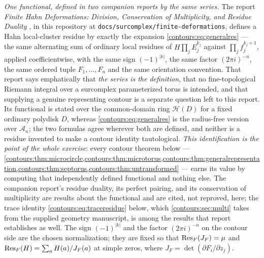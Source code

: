 \documentclass[11pt,letterpaper]{article}
\theoremstyle{definition}
\theoremstyle{remark}
\newcommand{\HH}{\mathcal H}\newcommand{\A}{\mathscr A}\newcommand{\OO}{\mathcal O}
\numberwithin{equation}{section}
\begin{document}
\emph{One functional, defined in two companion reports by the same series.} The
report \emph{Finite Hahn Deformations: Division, Conservation of Multiplicity,
and Residue Duality} \cite{FiniteDeformations}, in this repository at
\texttt{docs/surcomplex/finite-deformations}, defines a Hahn local-cluster
residue by exactly the expansion \eqref{contours:eq:generalres} --- the same
alternating sum of ordinary local residues of $H\prod_jE_j^{k_j}$ against
$\prod_jf_j^{k_j+1}$, applied coefficientwise, with the same sign $(-1)^{|k|}$,
the same factor $(2\pi i)^{-n}$, the same ordered tuple $F_1,\ldots,F_n$ and the
same orientation convention. That report says emphatically that \emph{the series
is the definition}, that no fine-topological Riemann integral over a surcomplex
parameterized torus is intended, and that supplying a genuine representing
contour is a separate question left to this report. Its functional is stated over
the common-domain ring $\HH(D)$ for a fixed ordinary polydisk $D$, whereas
\eqref{contours:eq:generalres} is the radius-free version over $\A_n$; the two
formulas agree wherever both are defined, and neither is a residue invented to
make a contour identity tautological. \emph{This identification is the point of
the whole exercise}: every contour theorem below ---
\cref{contours:thm:microcircle,contours:thm:microtorus,contours:thm:generalrepresentation,contours:thm:septorus,contours:thm:untransformed}
--- earns its value by computing that independently defined functional and
nothing else. The companion report's residue duality, its perfect pairing, and
its conservation of multiplicity are results about the functional and are cited,
not reproved, here; the trace identity \eqref{contours:eq:traceresidue} below,
which \cref{contours:sec:multi} takes from the supplied geometry
manuscript, is among the results that report establishes as well. The sign $(-1)^{|k|}$ and the
factor $(2\pi i)^{-n}$ on the contour side are the chosen normalization; they are
fixed so that $\operatorname{Res}_F(J_F)=\mu$ and $\operatorname{Res}_F(H)=\sum_aH(a)/J_F(a)$ at simple zeros,
where $J_F=\det(\partial F_i/\partial z_j)$.
\end{document}
